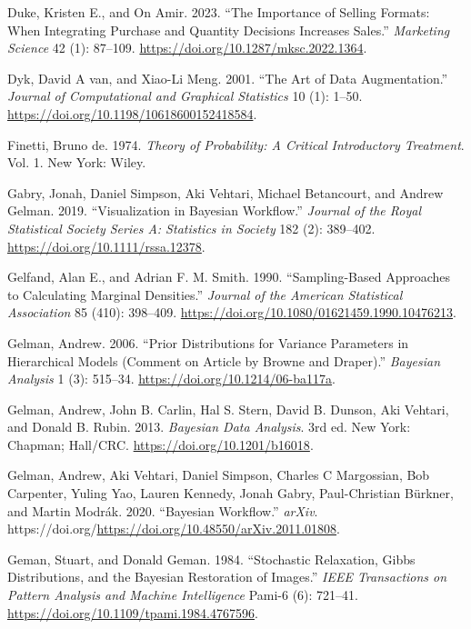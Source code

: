 \documentclass[
  11pt,
  letterpaper,
]{scrbook}
\newlength{\cslhangindent}
\newenvironment{CSLReferences}[2] %
 {\begin{list}{}{%
  \setlength{\itemindent}{0pt}
  \setlength{\leftmargin}{0pt}
  \setlength{\parsep}{0pt}
  \ifodd #1
   \setlength{\leftmargin}{\cslhangindent}
   \setlength{\itemindent}{-1\cslhangindent}
  \fi
  \setlength{\itemsep}{#2\baselineskip}}}
 {\end{list}}
\theoremstyle{definition}
\theoremstyle{plain}
\theoremstyle{plain}
\theoremstyle{definition}
\theoremstyle{definition}
\theoremstyle{remark}
\begin{document}
\begin{CSLReferences}{1}{0}
Duke, Kristen E., and On Amir. 2023. {``The Importance of Selling
Formats: When Integrating Purchase and Quantity Decisions Increases
Sales.''} \emph{Marketing Science} 42 (1): 87--109.
\url{https://doi.org/10.1287/mksc.2022.1364}.

Dyk, David A van, and Xiao-Li Meng. 2001. {``The Art of Data
Augmentation.''} \emph{Journal of Computational and Graphical
Statistics} 10 (1): 1--50.
\url{https://doi.org/10.1198/10618600152418584}.

Finetti, Bruno de. 1974. \emph{Theory of Probability: A Critical
Introductory Treatment}. Vol. 1. New York: Wiley.

Gabry, Jonah, Daniel Simpson, Aki Vehtari, Michael Betancourt, and
Andrew Gelman. 2019. {``{Visualization in {B}ayesian Workflow}.''}
\emph{Journal of the Royal Statistical Society Series A: Statistics in
Society} 182 (2): 389--402. \url{https://doi.org/10.1111/rssa.12378}.

Gelfand, Alan E., and Adrian F. M. Smith. 1990. {``Sampling-Based
Approaches to Calculating Marginal Densities.''} \emph{Journal of the
American Statistical Association} 85 (410): 398--409.
\url{https://doi.org/10.1080/01621459.1990.10476213}.

Gelman, Andrew. 2006. {``Prior Distributions for Variance Parameters in
Hierarchical Models (Comment on Article by {B}rowne and {D}raper).''}
\emph{Bayesian Analysis} 1 (3): 515--34.
\url{https://doi.org/10.1214/06-ba117a}.

Gelman, Andrew, John B. Carlin, Hal S. Stern, David B. Dunson, Aki
Vehtari, and Donald B. Rubin. 2013. \emph{Bayesian Data Analysis}. 3rd
ed. New York: Chapman; Hall/CRC. \url{https://doi.org/10.1201/b16018}.

Gelman, Andrew, Aki Vehtari, Daniel Simpson, Charles C Margossian, Bob
Carpenter, Yuling Yao, Lauren Kennedy, Jonah Gabry, Paul-Christian
Bürkner, and Martin Modrák. 2020. {``Bayesian Workflow.''} \emph{arXiv}.
https://doi.org/\url{https://doi.org/10.48550/arXiv.2011.01808}.

Geman, Stuart, and Donald Geman. 1984. {``Stochastic Relaxation, {G}ibbs
Distributions, and the {B}ayesian Restoration of Images.''} \emph{IEEE
Transactions on Pattern Analysis and Machine Intelligence} Pami-6 (6):
721--41. \url{https://doi.org/10.1109/tpami.1984.4767596}.


\end{CSLReferences}
\end{document}
